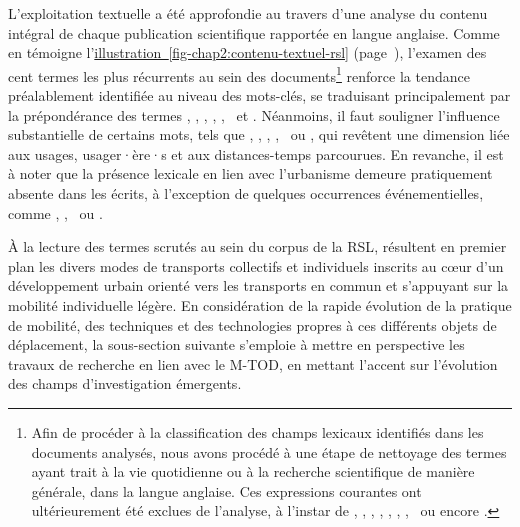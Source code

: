 \begin{refsegment}
L'exploitation textuelle a été approfondie au travers d'une analyse du contenu intégral de chaque publication scientifique rapportée en langue anglaise. Comme en témoigne l'\hyperref[fig-chap2:contenu-textuel-rsl]{illustration~\ref{fig-chap2:contenu-textuel-rsl}} (page~\pageref{fig-chap2:contenu-textuel-rsl}), l'examen des cent termes les plus récurrents au sein des documents\footnote{
    Afin de procéder à la classification des champs lexicaux identifiés dans les documents analysés, nous avons procédé à une étape de nettoyage des termes ayant trait à la vie quotidienne ou à la recherche scientifique de manière générale, dans la langue anglaise. Ces expressions courantes ont ultérieurement été exclues de l'analyse, à l'instar de , , , , , , , ~ou encore .
} renforce la tendance préalablement identifiée au niveau des mots-clés, se traduisant principalement par la prépondérance des termes , , , , , ~et . Néanmoins, il faut souligner l'influence substantielle de certains mots, tels que , , , , ~ou , qui revêtent une dimension liée aux usages, usager·ère·s et aux distances-temps parcourues. En revanche, il est à noter que la présence lexicale en lien avec l'urbanisme demeure pratiquement absente dans les écrits, à l'exception de quelques occurrences événementielles, comme , , ~ou .%

À la lecture des termes scrutés au sein du corpus de la \acrshort{RSL}, résultent en premier plan les divers modes de transports collectifs et individuels inscrits au cœur d'un développement urbain orienté vers les transports en commun et s'appuyant sur la mobilité individuelle légère. En considération de la rapide évolution de la pratique de mobilité, des techniques et des technologies propres à ces différents objets de déplacement, la sous-section suivante s'emploie à mettre en perspective les travaux de recherche en lien avec le \acrshort{M-TOD}, en mettant l'accent sur l'évolution des champs d'investigation émergents.%


\end{refsegment}
